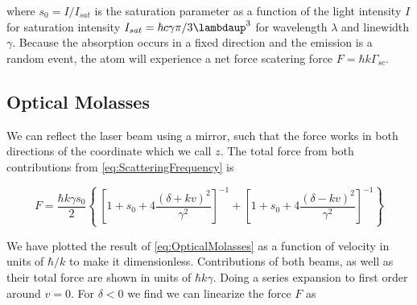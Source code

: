where $s_0 = I/I_{sat}$ is the saturation parameter as a function of the light intensity $I$ for saturation intensity $I_{sat} = \hbar c \gamma \pi/3\lambdaup^3$ for wavelength $\lambda$ and linewidth $\gamma$. Because the absorption occurs in a fixed direction and the emission is a random event, the atom will experience a net force scatering force $F = \hbar k \Gamma_{sc}$.

\subsection{Optical Molasses}

We can reflect the laser beam using a mirror, such that the force works in both directions of the coordinate which we call $z$. The total force from both contributions from \cref{eq:ScatteringFrequency} is \cite{Kowalski2010}

\begin{equation}\label{eq:OpticalMolasses}
	F = \frac{\hbar k \gamma s_0}{2}\left\{\
	\left[1 + s_0 + 4\frac{(\delta+kv)^2}{\gamma^2}\right]^{-1}+
	\left[1 + s_0 + 4\frac{(\delta-kv)^2}{\gamma^2}\right]^{-1}
	\right\}
\end{equation}

We have plotted the result of \cref{eq:OpticalMolasses} as a function of velocity in units of $\hbar / k$ to make it dimensionless. Contributions of both beams, as well as their total force are shown in units of $\hbar k \gamma$. Doing a series expansion to first order around $v = 0$. For $\delta<0$ we find we can linearize the force $F$ as 

